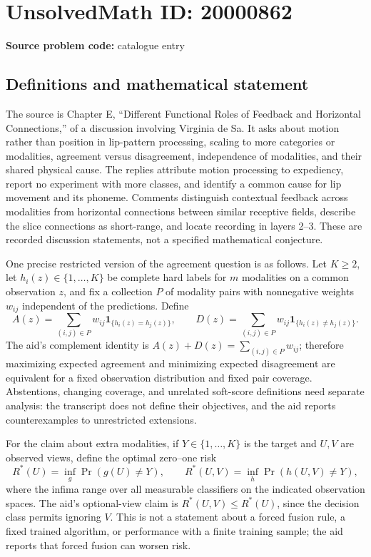\documentclass[11pt]{article}
\begin{document}
\section*{UnsolvedMath ID: 20000862}
\textbf{Source problem code:} catalogue entry
\subsection{Definitions and mathematical statement}
The source is Chapter E, ``Different Functional Roles of Feedback and Horizontal Connections,'' of a discussion involving Virginia de Sa. It asks about motion rather than position in lip-pattern processing, scaling to more categories or modalities, agreement versus disagreement, independence of modalities, and their shared physical cause. The replies attribute motion processing to expediency, report no experiment with more classes, and identify a common cause for lip movement and its phoneme. Comments distinguish contextual feedback across modalities from horizontal connections between similar receptive fields, describe the slice connections as short-range, and locate recording in layers 2--3. These are recorded discussion statements, not a specified mathematical conjecture.

One precise restricted version of the agreement question is as follows. Let $K\geq2$, let $h_i(z)\in\{1,\ldots,K\}$ be complete hard labels for $m$ modalities on a common observation $z$, and fix a collection $P$ of modality pairs with nonnegative weights $w_{ij}$ independent of the predictions. Define
\[
 A(z)=\sum_{(i,j)\in P}w_{ij}\mathbf1_{\{h_i(z)=h_j(z)\}},\qquad
 D(z)=\sum_{(i,j)\in P}w_{ij}\mathbf1_{\{h_i(z)\ne h_j(z)\}}.
\]
The aid's complement identity is $A(z)+D(z)=\sum_{(i,j)\in P}w_{ij}$; therefore maximizing expected agreement and minimizing expected disagreement are equivalent for a fixed observation distribution and fixed pair coverage. Abstentions, changing coverage, and unrelated soft-score definitions need separate analysis: the transcript does not define their objectives, and the aid reports counterexamples to unrestricted extensions.

For the claim about extra modalities, if $Y\in\{1,\ldots,K\}$ is the target and $U,V$ are observed views, define the optimal zero--one risk
\[
 R^*(U)=\inf_g\Pr(g(U)\ne Y),\qquad
 R^*(U,V)=\inf_h\Pr(h(U,V)\ne Y),
\]
where the infima range over all measurable classifiers on the indicated observation spaces. The aid's optional-view claim is $R^*(U,V)\leq R^*(U)$, since the decision class permits ignoring $V$. This is not a statement about a forced fusion rule, a fixed trained algorithm, or performance with a finite training sample; the aid reports that forced fusion can worsen risk.
\end{document}
